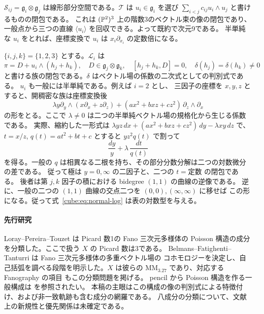 $\mathcal S_{ij}=\mathfrak g_i\otimes\mathfrak g_j$ は線形部分空間である。$\mathcal T$ は $u_i\in\mathfrak g_i$ を選び
$\sum_{i<j}c_{ij}u_i\wedge u_j$ と書けるものの閉包である。
これは $(\mathbb P^2)^3$ 上の階数3のベクトル束の像の閉包であり、
一般点から三つの直線 $\langle u_i\rangle$ を回収できる。よって既約で次元9である。
半単純な $u_i$ をとれば、座標変換で $u_i$ は $x_i\partial_{x_i}$ の定数倍になる。

$\{i,j,k\}=\{1,2,3\}$ とする。$\mathcal L_i$ は
\begin{equation}\label{cube:eq:log-family}
 \pi=D+u_i\wedge(h_j+h_k),\quad D\in\mathfrak g_j\otimes\mathfrak g_k,\quad
 [h_j+h_k,D]=0,\quad \delta(h_j)=\delta(h_k)\ne0
\end{equation}
と書ける族の閉包である。$\delta$ はベクトル場の係数の二次式としての判別式である。
$u_i$ も一般には半単純である。例えば $i=2$ とし、
三因子の座標を $x,y,z$ とすると、開稠密な族は座標変換後
\begin{equation}\label{cube:eq:normal-log}
 \lambda y\partial_y\wedge(x\partial_x+z\partial_z)
 +(a x^2+b xz+c z^2)\,\partial_z\wedge\partial_x
\end{equation}
の形をとる。ここで $\lambda\ne0$ は二つの半単純ベクトル場の規格化から生じる係数である。
実際、縮約した一形式は $\lambda yz\,dx+(a x^2+b xz+c z^2)\,dy-\lambda xy\,dz$ で、
$t=x/z$, $q(t)=a t^2+bt+c$ とすると $yz^2 q(t)$ で割って
\[
 \frac{dy}{y}+\lambda\,\frac{dt}{q(t)}
\]
を得る。一般の $q$ は相異なる二根を持ち、その部分分数分解は二つの対数微分の差である。
従って極は $y=0,\infty$ の二因子と、二つの $t=\text{定数}$ の閉包である。
後者は第 $j,k$ 因子の積における bidegree $(1,1)$ の曲線の逆像である。
逆に、一般の二つの $(1,1)$ 曲線の交点二つを $(0,0),(\infty,\infty)$ に移せば
この形になる。従って式~\eqref{cube:eq:normal-log} は表の対数型を与える。

\paragraph{先行研究}
Loray--Pereira--Touzet \cite[定理9.1]{p12-LPT} は Picard 数1の Fano 三次元多様体の
Poisson 構造の成分を分類した。ここで扱う $X$ の Picard 数は3である。
Belmans--Fatighenti--Tanturri \cite[\S2.2]{p12-BFT} は Fano 三次元多様体の多重ベクトル場の
コホモロジーを決定し、自己括弧を調べる段階を明示した。$X$ は彼らの
$\mathrm{MM}_{3.27}$ であり、対応する Fanography の項目 \cite{cube-Fano} もこの分類問題を掲げる。
pencil から Poisson 構造を作る一般構成は \cite[\S3.2.2]{p12-Pym} を参照されたい。
本稿の主眼はこの構成の像の判別式による特徴付け、および非一致軌跡も含む成分の網羅である。
八成分の分類について、文献上の新規性と優先関係は未確定である。

